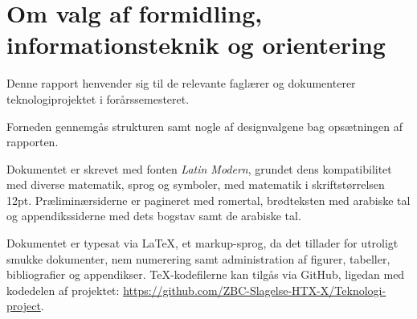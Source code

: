 \section{Om valg af formidling, informationsteknik og orientering}
    Denne rapport henvender sig til de relevante faglærer og dokumenterer teknologiprojektet i forårssemesteret. 

    Forneden gennemgås strukturen samt nogle af designvalgene bag opsætningen af rapporten.

    Dokumentet er skrevet med fonten \textit{Latin Modern}, grundet dens kompatibilitet med diverse matematik, sprog og symboler, med matematik i skriftstørrelsen 12pt. Præliminærsiderne er pagineret med romertal, brødteksten med arabiske tal og appendikssiderne med dets bogstav samt de arabiske tal.

    Dokumentet er typesat via \LaTeX, et markup-sprog, da det tillader for utroligt smukke dokumenter, nem numerering samt administration af figurer, tabeller, bibliografier og appendikser. \TeX-kodefilerne kan tilgås via GitHub, ligedan med kodedelen af projektet: \url{https://github.com/ZBC-Slagelse-HTX-X/Teknologi-project}.